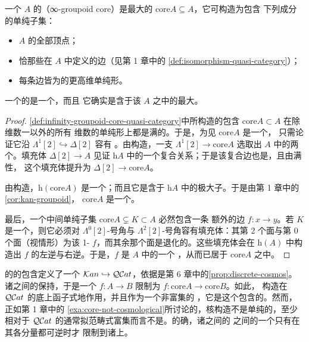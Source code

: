 \begin{definition}\label{def:infinity-groupoid-core-quasi-category}
一个\trQuasiCategory{} $A$ 的\textbf{\trInfinityGroupoidCore}（∞-groupoid
core）是最大的\trKanComplex{} $\mathrm{core}A\subseteq A$，它可构造为包含
下列成分的单纯子集：
\begin{itemize}
\item $A$ 的全部顶点；
\item 恰那些在 $A$ 中定义\trIsomorphism{}的边（见第 1 章中的%
  \cref{def:isomorphism-quasi-category}）；
\item 每条边皆为\trIsomorphism{}的更高维单纯形。
\end{itemize}
\end{definition}

\begin{lemma}\label{lem:core-is-kan-complex}
一个\trQuasiCategory{}的\trInfinityGroupoidCore{}是一个\trKanComplex，而且
它确实是含于该\trQuasiCategory{} $A$ 之中的最大\trKanComplex。
\end{lemma}

\begin{proof}
\cref{def:infinity-groupoid-core-quasi-category}中所构造的包含 $\mathrm{core}A\subset A$ 在除维数一以外的所有
维数的单纯形上都是满的。于是，为见 $\mathrm{core}A$ 是一个\trQuasiCategory，
只需论证它沿\trHorn{} $\Lambda^{1}[2]\hookrightarrow\Delta[2]$ 容有%
\trExtension。由构造，一支\trHorn{} $\Lambda^{1}[2]\to\mathrm{core}A$ 选取出
$A$ 中的两个\trIsomorphism。填充体 $\Delta[2]\to A$ 见证\trHomotopyCategory{}
$\mathrm{h}A$ 中的一个复合关系；于是该复合边也是\trIsomorphism，且由满性，
这个填充体提升为 $\Delta[2]\to\mathrm{core}A$。

由构造，$\mathrm{h}(\mathrm{core}A)$ 是一个\trGroupoid；而且它是含于
$\mathrm{h}A$ 中的极大子\trGroupoid。于是由第 1 章中的\cref{cor:kan-groupoid}，
$\mathrm{core}A$ 是一个\trKanComplex。

最后，一个中间单纯子集 $\mathrm{core}A\subsetneq K\subset A$ 必然包含一条
额外的边 $f\colon x\to y$。若 $K$ 是一个\trKanComplex，则它必须对
$\Lambda^{0}[2]$-号角与 $\Lambda^{2}[2]$-号角容有填充体：其第 2 个面与第 0
个面（视情形）为该 1-\trSimplex{} $f$，而其余那个面是退化的。这些填充体会在
$\mathrm{h}(A)$ 中构造出 $f$ 的左逆与右逆。于是，$f$ 是 $A$ 中的一个%
\trIsomorphism，从而已居于 $\mathrm{core}A$ 之中。
\end{proof}

\trKanComplex{}的\trInfinityCosmos{}的包含定义了一个\trCosmologicalEmbedding{}
$\mathcal{K}an\hookrightarrow\mathcal{Q}\mathcal{C}at$，依据是第 6 章中的\cref{prop:discrete-cosmos}。
诸\trQuasiCategory{}之间的\trFunctor{}保持\trIsomorphism，于是一个%
\trFunctor{} $f\colon A\to B$ 限制为\trFunctor{}
$f\colon\mathrm{core}A\to\mathrm{core}B$。如此，\trInfinityGroupoidCore{}%
构造在 $\mathcal{Q}\mathcal{C}at$ 的底\trCategory{}上函子式地作用，并且作为一个非富集的%
\trFunctor{}，它是这个包含的\trRightAdjoint。然而，正如第 1 章中的%
\cref{exa:core-not-cosmological}所讨论的，核构造不是单纯的，至少相对于
$\mathcal{Q}\mathcal{C}at$ 的通常拟范畴式富集而言不是。的确，诸\trQuasiCategory{}之间的%
\trFunctor{}之间的一个\trNaturalTransformation{}只有在其各分量都可逆时才
限制到诸\trInfinityGroupoidCore{}上。

